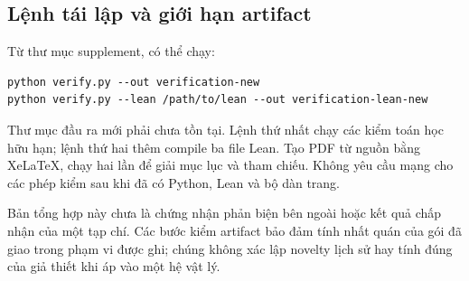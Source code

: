 \subsection{Lệnh tái lập và giới hạn artifact}
Từ thư mục supplement, có thể chạy:
\begin{verbatim}
python verify.py --out verification-new
python verify.py --lean /path/to/lean --out verification-lean-new
\end{verbatim}
Thư mục đầu ra mới phải chưa tồn tại. Lệnh thứ nhất chạy các kiểm toán học hữu hạn; lệnh thứ hai thêm compile ba file Lean. Tạo PDF từ nguồn bằng XeLaTeX, chạy hai lần để giải mục lục và tham chiếu. Không yêu cầu mạng cho các phép kiểm sau khi đã có Python, Lean và bộ dàn trang.

Bản tổng hợp này chưa là chứng nhận phản biện bên ngoài hoặc kết quả chấp nhận của một tạp chí. Các bước kiểm artifact bảo đảm tính nhất quán của gói đã giao trong phạm vi được ghi; chúng không xác lập novelty lịch sử hay tính đúng của giả thiết khi áp vào một hệ vật lý.
